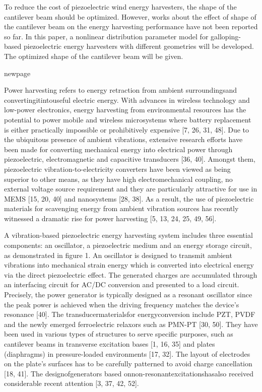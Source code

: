 \documentclass{article}
\begin{document}
To reduce the cost of piezoelectric wind energy harvesters, the shape of the cantilever beam should be optimized. However, works about the effect of shape of the cantilever beam on the energy harvesting performance
have not been reported so far. In this paper, a nonlinear distribution parameter model for galloping-based piezoelectric energy harvesters with different geometries will be developed. The optimized shape of the cantilever
beam will be given.








\newpage
newpage
\newpage



Power harvesting refers to energy retraction from ambient
surroundingsand convertingitintouseful electric energy. With
advances in wireless technology and low-power electronics,
energy harvesting from environmental resources has the
potential to power mobile and wireless microsystems where
battery replacement is either practically impossible or
prohibitively expensive [7, 26, 31, 48]. Due to the ubiquitous
presence of ambient vibrations, extensive research efforts
have been made for converting mechanical energy into
electrical power through piezoelectric, electromagnetic and
capacitive transducers [36, 40]. Amongst them, piezoelectric
vibration-to-electricity converters have been viewed as being
superior to other means, as they have high electromechanical
coupling, no external voltage source requirement and they
are particularly attractive for use in MEMS [15, 20, 40] and
nanosystems [28, 38]. As a result, the use of piezoelectric
materials for scavenging energy from ambient vibration
sources has recently witnessed a dramatic rise for power
harvesting [5, 13, 24, 25, 49, 56].

A vibration-based piezoelectric energy harvesting system
includes three essential components: an oscillator, a
piezoelectric medium and an energy storage circuit, as
demonstrated in figure 1. An oscillator is designed to transmit
ambient vibrations into mechanical strain energy which is
converted into electrical energy via the direct piezoelectric
effect. The generated charges are accumulated through an
interfacing circuit for AC/DC conversion and presented to
a load circuit. Precisely, the power generator is typically
designed as a resonant oscillator since the peak power is
achieved when the driving frequency matches the device’s
resonance [40]. The transducermaterialsfor energyconversion
include PZT, PVDF and the newly emerged ferroelectric
relaxors such as PMN-PT [30, 50]. They have been used in
various types of structures to serve specific purposes, such as
cantilever beams in transverse excitation bases [1, 16, 35] and
plates (diaphragms) in pressure-loaded environments [17, 32].
The layout of electrodes on the plate’s surfaces has to be
carefully patterned to avoid charge cancellation [18, 41]. The
designofgenerators based onnon-resonantexcitationshasalso
received considerable recent attention [3, 37, 42, 52].
\end{document}
